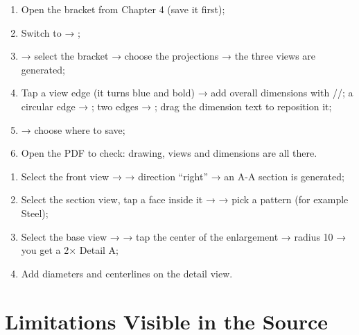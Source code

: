 \begin{practice}
\begin{enumerate}
  \item Open the bracket from Chapter 4 (save it first);
  \item Switch to  → ;
  \item {} → select the bracket → choose the projections 
        → the three views are generated;
  \item Tap a view edge (it turns blue and bold) → add overall dimensions with
        //; a circular edge → ; two edges →
        ; drag the dimension text to reposition it;
  \item {} → choose where to save;
  \item Open the PDF to check: drawing, views and dimensions are all there.
\end{enumerate}
\end{practice}

\begin{practice}
\begin{enumerate}
  \item Select the front view →  → direction ``right'' → an A-A section is generated;
  \item Select the section view, tap a face inside it →  → pick a pattern (for
        example Steel);
  \item Select the base view →  → tap the center of the enlargement → radius 10 →
        you get a 2× Detail A;
  \item Add diameters and centerlines on the detail view.
\end{enumerate}
\end{practice}

\section{Limitations Visible in the Source}


